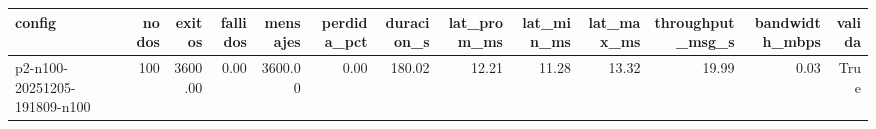 \begin{tabular}{lrrrrrrrrrrrr}
\toprule
config & nodos & exitos & fallidos & mensajes & perdida_pct & duracion_s & lat_prom_ms & lat_min_ms & lat_max_ms & throughput_msg_s & bandwidth_mbps & valida \\
\midrule
p2-n100-20251205-191809-n100 & 100 & 3600.00 & 0.00 & 3600.00 & 0.00 & 180.02 & 12.21 & 11.28 & 13.32 & 19.99 & 0.03 & True \\
\bottomrule
\end{tabular}
